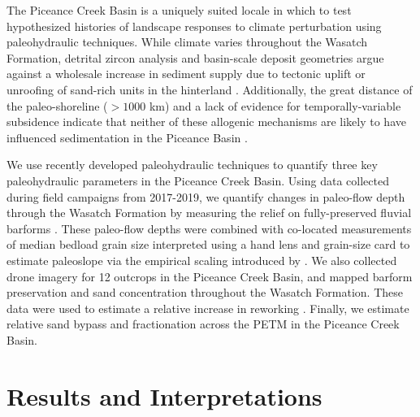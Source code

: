 \documentclass[draft]{compact_proposal}\usepackage[]{graphicx}\usepackage[]{color}
\begin{document}
The Piceance Creek Basin is a uniquely suited locale in which to test hypothesized histories of landscape responses to climate perturbation using paleohydraulic techniques. 
While climate varies throughout the Wasatch Formation, detrital zircon analysis and basin-scale deposit geometries argue against a wholesale increase in sediment supply due to tectonic uplift or unroofing of sand-rich units in the hinterland \parencite{foreman_fluvial_2012}.
Additionally, the great distance of the paleo-shoreline ($>1000$ km) and a lack of evidence for temporally-variable subsidence indicate that neither of these allogenic mechanisms are likely to have influenced sedimentation in the Piceance Basin \parencite{johnson_history_2003}.

We use recently developed paleohydraulic techniques to quantify three key paleohydraulic parameters in the Piceance Creek Basin.
Using data collected during field campaigns from 2017-2019, we quantify changes in paleo-flow depth through the Wasatch Formation by measuring the relief on fully-preserved fluvial barforms \parencite{mohrig_interpreting_2000}. 
These paleo-flow depths were combined with co-located measurements of median bedload grain size interpreted using a hand lens and grain-size card to estimate paleoslope via the empirical scaling introduced by \textcite{trampush_empirical_2014}.
We also collected drone imagery for 12 outcrops in the Piceance Creek Basin, and mapped barform preservation and sand concentration throughout the Wasatch Formation. 
These data were used to estimate a relative increase in reworking \parencite{chamberlin_using_2019}.
Finally, we estimate relative sand bypass and fractionation across the PETM in the Piceance Creek Basin.

\section{Results and Interpretations}
\end{document}
